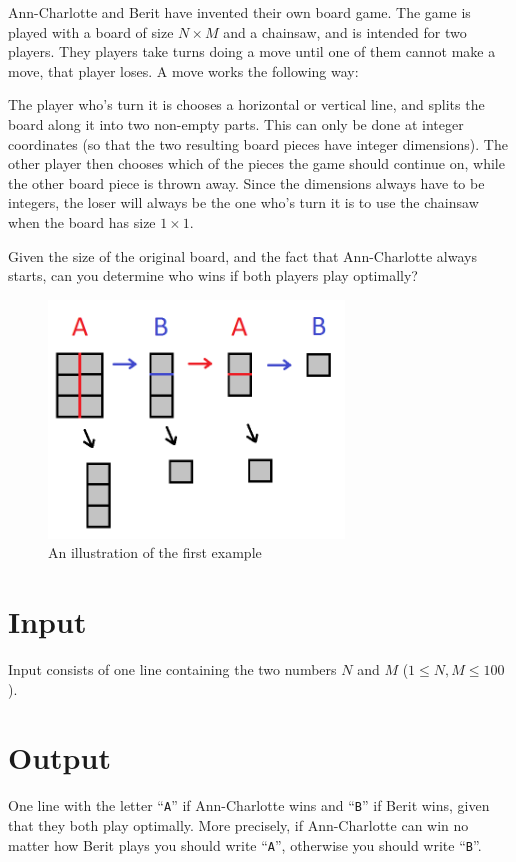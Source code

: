 
Ann-Charlotte and Berit have invented their own board game.
The game is played with a board of size $N \times M$ and a chainsaw, and is intended for two players.
They players take turns doing a move until one of them cannot make a move, that player loses.
A move works the following way:

The player who's turn it is chooses a horizontal or vertical line, and splits the board along it into two non-empty parts.
This can only be done at integer coordinates (so that the two resulting board pieces have integer dimensions).
The other player then chooses which of the pieces the game should continue on, while the other board piece is thrown away.
Since the dimensions always have to be integers, the loser will always be the one who's turn it is to use the chainsaw when the board has size $1 \times 1$.

Given the size of the original board, and the fact that Ann-Charlotte always starts, can you determine who wins if both players play optimally?

\begin{figure}[ht!]
\centering
\includegraphics[width=0.7\textwidth]{bradspelet.png}
\caption{An illustration of the first example}
\label{overflow}
\end{figure}

\section*{Input}
Input consists of one line containing the two numbers $N$ and $M$ ($1 \le N,M \le 100$).

\section*{Output}
One line with the letter ``\texttt{A}'' if Ann-Charlotte wins and ``\texttt{B}'' if
Berit wins, given that they both play optimally. More precisely, if Ann-Charlotte
can win no matter how Berit plays you should write ``\texttt{A}'', otherwise you
should write ``\texttt{B}''.

